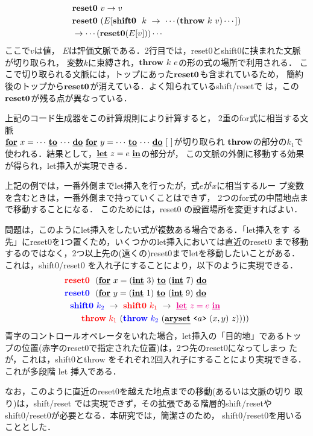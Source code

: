 \begin{align*}
  & \textbf{reset0} ~v \to v \\
  & \textbf{reset0} ~(E[\textbf{shift0}~~k~\to~\cdots(\textbf{throw}~k~v)\cdots]) \\
  & \to \cdots(\textbf{reset0}(E[v]))\cdots
\end{align*}
ここで$v$は値，
$E$は評価文脈である．2行目では，reset0とshift0に挟まれた文脈が切り取られ，
変数$k$に束縛され，$\textbf{throw}~k~e$の形の式の場所で利用される．
ここで切り取られる文脈には，トップにあった$\textbf{reset0}$も含まれているため，
簡約後のトップから$\textbf{reset0}$が消えている．よく知られているshift/resetで
は，この$\textbf{reset0}$が残る点が異なっている．

上記のコード生成器をこの計算規則により計算すると，
2重のfor式に相当する文脈\\
$\underline{\textbf{for}}~{x=\cdots}~\underline{\textbf{to}}~{\cdots}~\underline{\textbf{do}}~\underline{\textbf{for}}~{y=\cdots}~\underline{\textbf{to}}~{\cdots}~\underline{\textbf{do}}~[~]$が切り取られ
$\textbf{throw}$の部分の$k_1$で使われる．結果として，$\underline{\textbf{let}}~z=e~\underline{\textbf{in}}$の部分が，
この文脈の外側に移動する効果が得られ，let挿入が実現できる．

上記の例では，一番外側までlet挿入を行ったが，式$e$が$x$に相当するルー
プ変数を含むときは，一番外側まで持っていくことはできず，
2つのfor式の中間地点まで移動することになる．
このためには，reset0 の設置場所を変更すればよい．

問題は，このようにlet挿入をしたい式が複数ある場合である．「let挿入をす
る先」にreset0を1つ置くため，いくつかのlet挿入においては直近のreset0
まで移動するのではなく，2つ以上先の(遠くの)reset0までletを移動したいことがある．
これは，shift0/reset0 を入れ子にすることにより，以下のように実現できる．
\begin{align*}
  &\textcolor{red}{\textbf{reset0}} ~~(\underline{\textbf{for}}~{x=(\underline{\textbf{int}}~3)}~\underline{\textbf{to}}~{(\underline{\textbf{int}}~7)}~\underline{\textbf{do}} \\
  &\textcolor{blue}{\textbf{reset0}} ~~(\underline{\textbf{for}}~{y=(\underline{\textbf{int}}~1)}~\underline{\textbf{to}}~{(\underline{\textbf{int}}~9)}~\underline{\textbf{do}} \\
  &~~\textcolor{blue}{\textbf{shift0}}~\textcolor{blue}{k_2}~\to~ \textcolor{red}{\textbf{shift0}}~\textcolor{red}{k_1}~\to~ \textcolor{magenta}{\underline{\textbf{let}}~z=e~\underline{\textbf{in}}} \\
  &~~~~~~
    \textcolor{red}{\textbf{throw}}~\textcolor{red}{k_1}~(\textcolor{blue}{\textbf{throw}}~\textcolor{blue}{k_2}~(\underline{\textbf{aryset}}~{\texttt{<}{a}\texttt{>}}~{(x,y)}~{z}))))
\end{align*}
青字のコントロールオペレータをいれた場合，let挿入の「目的地」であるトッ
プの位置(赤字のreset0で指定された位置)は，2つ先のreset0になってしまっ
たが，これは，shift0とthrow をそれぞれ2回入れ子にすることにより実現できる．
これが多段階 let 挿入である．

なお，このように直近のreset0を越えた地点までの移動(あるいは文脈の切り
取り)は，shift/reset では実現できず，その拡張である階層的shift/resetや
shift0/reset0が必要となる．本研究では，簡潔さのため，
shift0/reset0を用いることとした．

